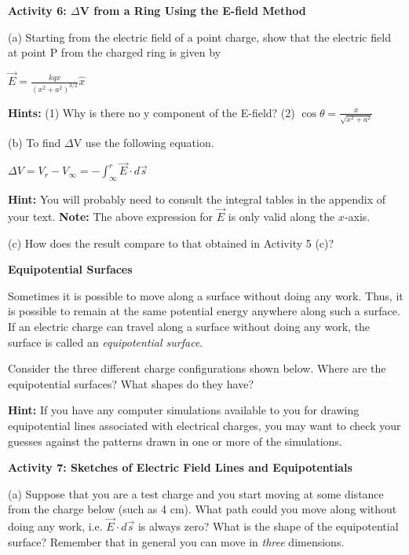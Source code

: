 \textbf{Activity 6: \( \Delta  \)V from a Ring Using the E-field
Method}

(a) Starting from the electric field of a point charge, show that
the electric field at point P from the charged ring is given by

{\centering \( \overrightarrow{E}=\frac{kqx}{(x^{2}+a^{2})^{3/2}}\hat{x} \)\par}

\textbf{Hints:} (1) Why is there no y component of the E-field? (2)
\( \cos \theta =\frac{x}{\sqrt{x^{2}+a^{2}}} \)
\answerspace{30mm}

(b) To find \( \Delta  \)V use the following equation.

{\centering \( \Delta V=V_{r}-V_{\infty }=-\int ^{r}_{\infty }\overrightarrow{E}\cdot d\overrightarrow{s} \)\par}
\textbf{Hint:} You will probably need to consult the integral tables in the appendix of your text.
\textbf{Note:} The above expression for $\overrightarrow{E}$ is only valid along the $x$-axis.
\answerspace{30mm}

(c) How does the result compare to that obtained in Activity 5 (c)?
\answerspace{10mm}

\pagebreak %
\begin{samepage}
\textbf{Equipotential Surfaces}

Sometimes it is possible to move along a surface without doing any
work. Thus, it is possible to remain at the same potential energy
anywhere along such a surface. If an electric charge can travel along
a surface without doing any work, the surface is called an \emph{equipotential
surface}.
\end{samepage}
Consider the three different charge configurations shown below. Where
are the equipotential surfaces? What shapes do they have?

\textbf{Hint:} If you have any computer simulations available to you
for drawing equipotential lines associated with electrical charges,
you may want to check your guesses against the patterns drawn in one
or more of the simulations.

\textbf{Activity 7: Sketches of Electric Field Lines and Equipotentials}

(a) Suppose that you are a test charge and you start moving at some
distance from the charge below (such as 4 cm). What path could you
move along without doing any work, i.e. \( \overrightarrow{E}\cdot d\overrightarrow{s} \)
is always zero? What is the shape of the equipotential surface? Remember
that in general you can move in \emph{three} dimensions.

